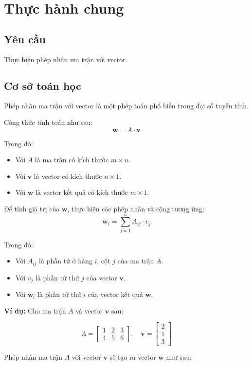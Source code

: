 \newpage
\section{Thực hành chung}
\subsection{Yêu cầu}
Thực hiện phép nhân ma trận với vector.
\subsection{Cơ sở toán học}
Phép nhân ma trận với vector là một phép toán phổ biến trong đại số tuyến tính.

Công thức tính toán như sau:
\[ \mathbf{w} = A \cdot \mathbf{v} \]

Trong đó:
\begin{itemize}
 \item Với \( A \) là ma trận có kích thước \( m \times n \).
 \item Với \( \mathbf{v} \) là vector có kích thước \( n \times 1 \).
 \item Với \( \mathbf{w} \) là vector kết quả có kích thước \( m \times 1 \).
\end{itemize}

Để tính giá trị của \( \mathbf{w} \), thực hiện các phép nhân và cộng tương ứng:
\[ \mathbf{w}_i = \sum_{j=1}^{n} A_{ij} \cdot v_j \]

Trong đó:
\begin{itemize}
 \item Với \( A_{ij} \) là phần tử ở hàng \( i \), cột \( j \) của ma trận \( A \).
 \item Với \( v_j \) là phần tử thứ \( j \) của vector \( \mathbf{v} \).
 \item Với \( \mathbf{w}_i \) là phần tử thứ \( i \) của vector kết quả \( \mathbf{w} \).
\end{itemize}

\textbf{Ví dụ:}
Cho ma trận \( A \) và vector \( \mathbf{v} \) sau:

\[ A = \begin{bmatrix} 1 & 2 & 3 \\ 4 & 5 & 6 \end{bmatrix}, \quad \mathbf{v} = \begin{bmatrix} 2 \\ 1 \\ 3 \end{bmatrix} \]

Phép nhân ma trận \( A \) với vector \( \mathbf{v} \) sẽ tạo ra vector \( \mathbf{w} \) như sau:

